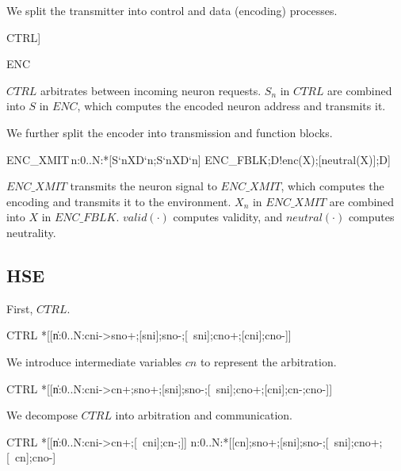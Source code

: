 \documentclass{article}
\begin{document}
We split the transmitter into control and data (encoding) processes. 

\begin{csp}
CTRL\equiv*[[\langle\|n:0..N\-1:#{C`n}->S`n;S`n;C`n;C`n\rangle]]
\end{csp}

\begin{csp}
ENC
\end{csp}

\noindent $CTRL$ arbitrates between incoming neuron requests. $S_n$ in $CTRL$ are combined into $S$ in $ENC$, which computes the encoded neuron address and transmits it.

We further split the encoder into transmission and function blocks.

\begin{csp}
ENC_XMIT\equiv\langle\pll\,n:0..N:*[S`n\star\!XD`n;S`n\star\!XD`n]\rangle
ENC_FBLK\equiv*[[valid(X)];D!enc(X);[neutral(X)];D]
\end{csp}

\noindent $ENC\_XMIT$ transmits the neuron signal to $ENC\_XMIT$, which computes the encoding and transmits it to the environment. $X_n$ in $ENC\_XMIT$ are combined into $X$ in $ENC\_FBLK$. $valid(\cdot)$ computes validity, and $neutral(\cdot)$ computes neutrality.

\subsection{HSE}

First, $CTRL$.

\begin{hse}
CTRL\equiv
*[[\langle\|n:0..N:cni->sno+;[sni];sno-;[~sni];cno+;[cni];cno-\rangle]]
\end{hse}

We introduce intermediate variables $cn$ to represent the arbitration.

\begin{hse}
CTRL\equiv
*[[\langle\|n:0..N:cni->cn+;sno+;[sni];sno-;[~sni];cno+;[cni];cn-;cno-\rangle]]
\end{hse}

We decompose $CTRL$ into arbitration and communication.

\begin{hse}
CTRL\equiv
*[[\langle\|n:0..N:cni->cn+;[~cni];cn-;\rangle]] \pll
\langle\pll\!n:0..N:*[[cn];sno+;[sni];sno-;[~sni];cno+;[~cn];cno-]\rangle
\end{hse}
\end{document}
